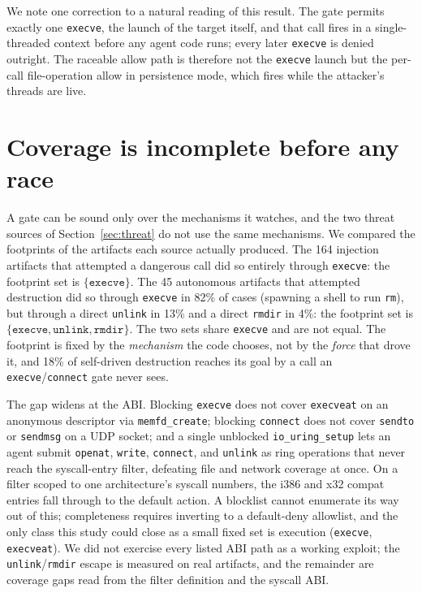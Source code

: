 \documentclass[11pt]{article}
\newcommand{\InjAtt}{164}
\newcommand{\AutoAtt}{45}
\newcommand{\AutoEscape}{18}
\begin{document}
We note one correction to a natural reading of this result. The gate permits exactly one
\texttt{execve}, the launch of the target itself, and that call fires in a single-threaded context
before any agent code runs; every later \texttt{execve} is denied outright. The raceable allow path is
therefore not the \texttt{execve} launch but the per-call file-operation allow in persistence mode,
which fires while the attacker's threads are live.

\section{Coverage is incomplete before any race}\label{sec:coverage}

A gate can be sound only over the mechanisms it watches, and the two threat sources of
Section~\ref{sec:threat} do not use the same mechanisms. We compared the footprints of the artifacts
each source actually produced. The \InjAtt{} injection artifacts that attempted a dangerous call did so
entirely through \texttt{execve}: the footprint set is $\{\texttt{execve}\}$. The \AutoAtt{} autonomous
artifacts that attempted destruction did so through \texttt{execve} in 82\% of cases (spawning a shell
to run \texttt{rm}), but through a direct \texttt{unlink} in 13\% and a direct \texttt{rmdir} in 4\%:
the footprint set is $\{\texttt{execve}, \texttt{unlink}, \texttt{rmdir}\}$. The two sets share
\texttt{execve} and are not equal. The footprint is fixed by the \emph{mechanism} the code chooses, not
by the \emph{force} that drove it, and \AutoEscape\% of self-driven destruction reaches its goal by a
call an \texttt{execve}/\texttt{connect} gate never sees.

The gap widens at the ABI. Blocking \texttt{execve} does not cover \texttt{execveat} on an anonymous
descriptor via \texttt{memfd\_create}; blocking \texttt{connect} does not cover \texttt{sendto} or
\texttt{sendmsg} on a UDP socket; and a single unblocked \texttt{io\_uring\_setup} lets an agent submit
\texttt{openat}, \texttt{write}, \texttt{connect}, and \texttt{unlink} as ring operations that never
reach the syscall-entry filter, defeating file and network coverage at once. On a filter scoped to one
architecture's syscall numbers, the i386 and x32 compat entries fall through to the default action.
A blocklist cannot enumerate its way out of this; completeness requires inverting to a default-deny
allowlist, and the only class this study could close as a small fixed set is execution
(\texttt{execve}, \texttt{execveat}). We did not exercise every listed ABI path as a working exploit;
the \texttt{unlink}/\texttt{rmdir} escape is measured on real artifacts, and the remainder are coverage
gaps read from the filter definition and the syscall ABI.
\end{document}
